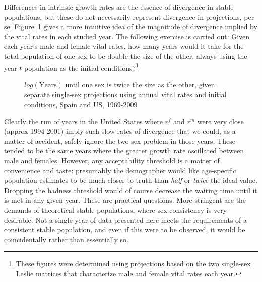 
Differences in intrinsic growth rates are the essence of divergence in
stable populations, but these do not necessarily represent divergence in
projections, per se. Figure~\ref{fig:rSRdoubling} gives a more intuitive idea of
the magnitude of divergence implied by the vital rates in each studied year. The following
 exercise is carried out: Given each year's male and
female vital rates, how many years would it take for the total population of one
sex to be double the size of the other, always using the year $t$ population as
the initial conditions?\footnote{These figures were determined using projections
based on the two single-sex Leslie matrices that characterize male and female
vital rates each year.}

\begin{figure}[ht!]
        \centering  
          \caption{$log(\mathrm{Years})$ until one sex is twice the size as the
          other, given separate single-sex projections using annual vital rates and initial
          conditions, Spain and US, 1969-2009}
           \quad
          \label{fig:rSRdoubling}
\end{figure}

Clearly the run of years in the United States where $r^f$ and $r^m$ were very
close (approx 1994-2001) imply such slow rates of divergence that we could, as a
matter of accident, safely ignore the two sex problem in those years. These
tended to be the same years where the greater growth rate oscillated between
male and females. However, any acceptability threshold is a matter of
convenience and taste: presumably the demographer would like age-specific 
population estimates to be much closer to truth than \textit{half} or \textit{twice} the ideal value.
Dropping the badness threshold would of course decrease the waiting time until
it is met in any given year. These are practical questions. More
stringent are the demands of theoretical stable populations, where
sex consistency is very desirable. Not a single year of data presented here
meets the requirements of a consistent stable population, and even if this were
to be observed, it would be coincidentally rather than essentially so. 
